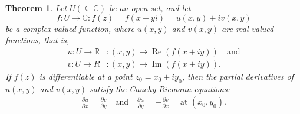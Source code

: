 \documentclass[12pt,openany]{book}
\newtheorem{theorem}{Theorem}[chapter]
\theoremstyle{definition}
\newcommand{\R}{\mathbb{R}}
\newcommand{\C}{\mathbb{C}}
\newcommand{\of}[1]{\left( #1 \right)}
\renewcommand{\Re}{\operatorname{Re}}
\renewcommand{\Im}{\operatorname{Im}}
\begin{document}
	
	\begin{tcolorbox}[colframe=thmcolor, title={\color{white}\bf Cauchy-Riemann Equations}]
		\begin{theorem}
			Let $U\of{\subseteq\C}$ be an open set, and let \[f:U\to\C:f(z) =f\of{x+yi} = u(x, y) + iv(x, y)
			\] be a complex-valued function, where $u(x, y)$ and $v(x, y)$ are real-valued functions, that is, \begin{align*}
				u:U\to\R&:(x,y)\mapsto \Re\of{f(x+iy)}\quad\text{and}\\ v:U\to R&:\of{x,y}\mapsto\Im\of{f(x+iy)}.
			\end{align*} If $f(z)$ is differentiable at a point $z_0 = x_0 + iy_0$, then the partial derivatives of $u(x, y)$ and $v(x, y)$ satisfy the Cauchy-Riemann equations: \begin{align*}
				\frac{\partial u}{\partial x}= \frac{\partial v}{\partial y}\quad\text{and}\quad
				\frac{\partial u}{\partial y}= -\frac{\partial v}{\partial x}\quad\text{ at $(x_0, y_0)$}.
			\end{align*}
		\end{theorem}
	\end{tcolorbox}
	
\end{document}
